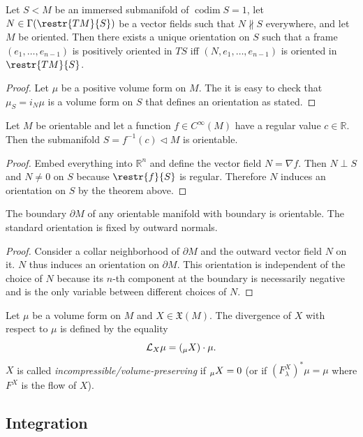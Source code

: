\documentclass[english,letterpaper]{article}%
\numberwithin{equation}{section}
\numberwithin{figure}{section}
\numberwithin{table}{section}
\theoremstyle{definition}
\theoremstyle{definition}
\theoremstyle{definition}
\theoremstyle{plain}
\theoremstyle{plain}
\theoremstyle{plain}
\theoremstyle{plain}
\theoremstyle{remark}
\theoremstyle{remark}
\DeclareMathOperator{\codim}{codim}
\let\div\relax
\DeclareMathOperator{\div}{div}
\newcommand{\Lie}{\mathcal{L}}
\newcommand{\fX}{\mathfrak{X}}
\newcommand{\sub}{\vartriangleleft}
\begin{document}
\begin{thm}
Let $S<M$ be an immersed submanifold of $\codim S=1$, let $N\in\Gamma(\restr{TM}{S})$ be a vector fields such that $N\not\parallel S$ everywhere, and let $M$ be oriented. Then there exists a unique orientation on $S$ such that a frame $(e_1,\ldots,e_{n-1})$ is positively oriented in $TS$ iff $(N,e_1,\ldots,e_{n-1})$ is oriented in $\restr{TM}{S}$.
\end{thm}
\begin{proof}
Let $\mu$ be a positive volume form on $M$. The it is easy to check that $\mu_S=i_N \mu$ is a volume form on $S$ that defines an orientation as stated.
\end{proof}
\begin{cor}
Let $M$ be orientable and let a function $f\in C^\infty(M)$ have a regular value $c\in \mathbb{R}$. Then the submanifold $S=f^{-1}(c)\sub M$ is orientable.
\end{cor}
\begin{proof}
Embed everything into $\mathbb{R}^n$ and define the vector field $N=\nabla f$. Then $N\perp S$ and $N\neq 0$ on $S$ because $\restr{f}{S}$ is regular. Therefore $N$ induces an orientation on $S$ by the theorem above.
\end{proof}
\begin{cor}
The boundary $\partial M$ of any orientable manifold with boundary is orientable. The standard orientation is fixed by outward normals.
\end{cor}
\begin{proof}
Consider a collar neighborhood of $\partial M$ and the outward vector field $N$ on it. $N$ thus induces an orientation on $\partial M$. This orientation is independent of the choice of $N$ because its $n$-th component at the boundary is necessarily negative and is the only variable between different choices of $N$.
\end{proof}


\begin{defn}
Let $\mu$ be a volume form on $M$ and $X\in \fX(M)$. The divergence of $X$ with respect to $\mu$ is defined by the equality
\[\Lie_X\mu =(\div_{\mu} X)\cdot \mu.\]
$X$ is called \emph{incompressible/volume-preserving} if $\div_\mu X=0$ (or if $(F^X_\lambda)^\ast\mu=\mu$ where $F^X$ is the flow of $X$).
\end{defn}





\subsection{Integration}
\end{document}

